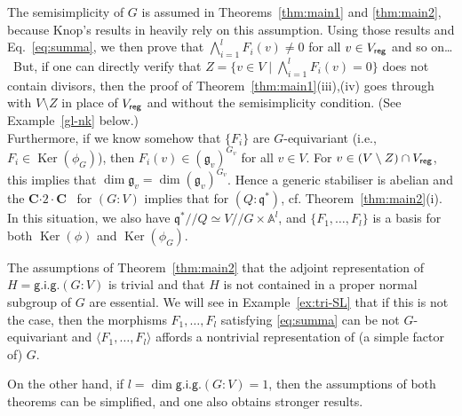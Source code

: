 \begin{rmk}       \label{rmk:about-ss}
The semisimplicity of $G$ is assumed in Theorems~\ref{thm:main1} and \ref{thm:main2}, because Knop's 
results in \cite{kn86} heavily rely on this assumption. Using those results and Eq.~\eqref{eq:summa}, we
then prove that $\bigwedge_{i=1}^l F_i(v)\ne 0$ for all $v\in V_{\sf reg}$ and so on\dots 
\ But, if one can directly verify that
$Z=\{v\in V\mid \bigwedge_{i=1}^l F_i(v)=0\}$ does not contain divisors, 
then the proof of Theorem~\ref{thm:main1}(iii),(iv) goes through with $V\setminus Z$ in place of 
$V_{\sf reg}$ and without the semisimplicity condition.
(See Example~\ref{gl-nk} below.)
\\ \indent
Furthermore, if we know somehow that $\{F_i\}$ are $G$-equivariant (i.e., $F_i\in{\operatorname{Ker}}(\phi_G)$), then
$F_i(v)\in ({{\mathfrak g}}_v)^{G_v}$ for all $v\in V$. For $v\in (V\setminus Z)\cap V_{\sf reg}$, this implies that $\dim {{\mathfrak g}}_v=
\dim ({{\mathfrak g}}_v)^{G_v}$.  Hence a generic stabiliser is abelian and the {\textsf{\bfseries C${\cdot}2{\cdot}$C}\ } for $(G:V)$ implies that for $(Q:{{\mathfrak q}}^*)$, cf. Theorem~\ref{thm:main2}(i). In this situation, we also have 
${{\mathfrak q}}^*{/\!\!/} Q\simeq V{/\!\!/} G\times \mathbb A^l$, and $\{F_1,\dots, F_l\}$ is a basis for both ${\operatorname{Ker}}(\phi)$ 
and ${\operatorname{Ker}}(\phi_G)$.
\end{rmk}
\begin{rmk}     \label{rmk:essential-h}
The assumptions of Theorem~\ref{thm:main2} that the adjoint representation of $H={\mathsf{g.i.g.}}(G:V)$ is 
trivial and that $H$ is not contained in a proper normal subgroup of $G$ are essential. We will see in Example~\ref{ex:tri-SL} that  if this is not the case, then the 
morphisms $F_1,\dots,F_l$ satisfying \eqref{eq:summa} can be not $G$-equivariant and 
$\langle F_1,\dots,F_l\rangle$ affords a nontrivial representation of (a simple factor of) $G$.
\end{rmk}
\noindent
On the other hand, if $l=\dim{\mathsf{g.i.g.}}(G:V)=1$, then the assumptions of both theorems can be simplified,
and one also obtains stronger results.

